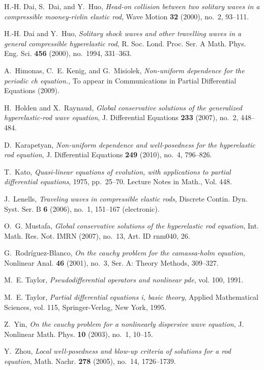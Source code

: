 \documentclass[12pt,reqno]{amsart}
\numberwithin{equation}{section}  %
\numberwithin{figure}{section}
\begin{document}
\begin{thebibliography}{HKM09}
H.-H. Dai, S.~Dai, and Y.~Huo, \emph{Head-on collision between two solitary
  waves in a compressible mooney-rivlin elastic rod}, Wave Motion \textbf{32}
  (2000), no.~2, 93--111.

H.-H. Dai and Y.~Huo, \emph{Solitary shock waves and other travelling waves in
  a general compressible hyperelastic rod}, R. Soc. Lond. Proc. Ser. A Math.
  Phys. Eng. Sci. \textbf{456} (2000), no.~1994, 331--363.

A.~Himonas, C.~E. Kenig, and G.~Misiolek, \emph{Non-uniform dependence for the
  periodic ch equation.}, To appear in Communications in Partial Differential
  Equations (2009).

H.~Holden and X.~Raynaud, \emph{Global conservative solutions of the
  generalized hyperelastic-rod wave equation}, J. Differential Equations
  \textbf{233} (2007), no.~2, 448--484.

D.~Karapetyan, \emph{Non-uniform dependence and well-posedness for the
  hyperelastic rod equation}, J. Differential Equations \textbf{249} (2010),
  no.~4, 796--826. 

T.~Kato, \emph{Quasi-linear equations of evolution, with applications to
  partial differential equations}, 1975, pp.~25--70. Lecture Notes in Math.,
  Vol. 448.

J.~Lenells, \emph{Traveling waves in compressible elastic rods}, Discrete
  Contin. Dyn. Syst. Ser. B \textbf{6} (2006), no.~1, 151--167 (electronic).

O.~G. Mustafa, \emph{Global conservative solutions of the hyperelastic rod
  equation}, Int. Math. Res. Not. IMRN (2007), no.~13, Art. ID rnm040, 26.

G.~Rodr\'iguez-Blanco, \emph{On the cauchy problem for the camassa-holm
  equation}, Nonlinear Anal. \textbf{46} (2001), no.~3, Ser. A: Theory Methods,
  309--327.

M.~E. Taylor, \emph{Pseudodifferential operators and nonlinear pde}, vol. 100,
  1991.

M.~E. Taylor, \emph{Partial differential equations i, basic theory}, Applied
  Mathematical Sciences, vol. 115, Springer-Verlag, New York, 1995.

Z.~Yin, \emph{On the cauchy problem for a nonlinearly dispersive wave
  equation}, J. Nonlinear Math. Phys. \textbf{10} (2003), no.~1, 10--15.

Y.~Zhou, \emph{Local well-posedness and blow-up criteria of solutions for a rod
  equation}, Math. Nachr. \textbf{278} (2005), no.~14, 1726--1739.

\end{thebibliography}
%
%
%
%
%
%
\end{document}

